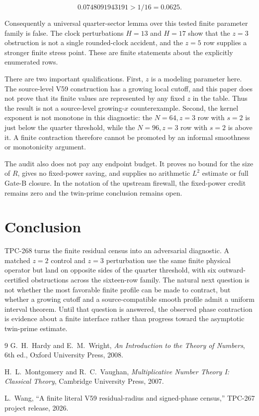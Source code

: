 \documentclass[11pt]{article}
\begin{document}
\[
 0.0748091943191>1/16=0.0625.
\]

Consequently a universal quarter-sector lemma over this tested finite
parameter family is false. The clock perturbations \(H=13\) and \(H=17\)
show that the \(z=3\) obstruction is not a single rounded-clock accident,
and the \(z=5\) row supplies a stronger finite stress point. These are
finite statements about the explicitly enumerated rows.

There are two important qualifications. First, \(z\) is a modeling
parameter here. The source-level V59 construction has a growing local
cutoff, and this paper does not prove that its finite values are represented
by any fixed \(z\) in the table. Thus the result is not a source-level
growing-\(x\) counterexample. Second, the kernel exponent is not monotone in
this diagnostic: the \(N=64,z=3\) row with \(s=2\) is just below the quarter
threshold, while the \(N=96,z=3\) row with \(s=2\) is above it. A finite
contraction therefore cannot be promoted by an informal smoothness or
monotonicity argument.

The audit also does not pay any endpoint budget. It proves no bound for the
size of \(R\), gives no fixed-power saving, and supplies no arithmetic
\(L^2\) estimate or full Gate-B closure. In the notation of the upstream
firewall, the fixed-power credit remains zero and the twin-prime conclusion
remains open.

\section{Conclusion}

TPC-268 turns the finite residual census into an adversarial diagnostic. A
matched \(z=2\) control and \(z=3\) perturbation use the same finite physical
operator but land on opposite sides of the quarter threshold, with six
outward-certified obstructions across the sixteen-row family. The natural
next question is not whether the most favorable finite profile can be made
to contract, but whether a growing cutoff and a source-compatible smooth
profile admit a uniform interval theorem. Until that question is answered,
the observed phase contraction is evidence about a finite interface rather
than progress toward the asymptotic twin-prime estimate.

\begin{thebibliography}{9}
G.~H.~Hardy and E.~M.~Wright,
\emph{An Introduction to the Theory of Numbers}, 6th ed., Oxford
University Press, 2008.

H.~L.~Montgomery and R.~C.~Vaughan,
\emph{Multiplicative Number Theory I: Classical Theory}, Cambridge
University Press, 2007.

L.~Wang, ``A finite literal V59 residual-radius and signed-phase census,''
TPC-267 project release, 2026.
\end{thebibliography}
\end{document}
